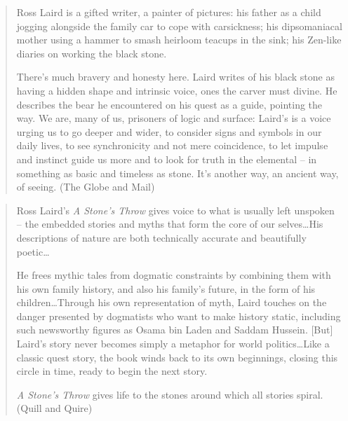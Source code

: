 \documentclass[10pt,DIV09,letterpaper,oneside,headsepline]{scrreprt}
\begin{document}
\begin{quotation}
Ross Laird is a gifted writer, a painter of pictures: his father as a child jogging alongside the family car to cope with carsickness; his dipsomaniacal mother using a hammer to smash heirloom teacups in the sink; his Zen-like diaries on working the black stone.

There's much bravery and honesty here. Laird writes of his black stone as having a hidden shape and intrinsic voice, ones the carver must divine. He describes the bear he encountered on his quest as a guide, pointing the way. We are, many of us, prisoners of logic and surface: Laird's is a voice urging us to go deeper and wider, to consider signs and symbols in our daily lives, to see synchronicity and not mere coincidence, to let impulse and instinct guide us more and to look for truth in the elemental -- in something as basic and timeless as stone. It's another way, an ancient way, of seeing. (The Globe and Mail) \end{quotation}

\begin{quotation}
Ross Laird's \textit{A Stone's Throw} gives voice to what is usually left unspoken -- the embedded stories and myths that form the core of our selves\ldots His descriptions of nature are both technically accurate and beautifully poetic\ldots

He frees mythic tales from dogmatic constraints by combining them with his own family history, and also his family's future, in the form of his children\ldots Through his own representation of myth, Laird touches on the danger presented by dogmatists who want to make history static, including such newsworthy figures as Osama bin Laden and Saddam Hussein. [But] Laird's story never becomes simply a metaphor for world politics\dots Like a classic quest story, the book winds back to its own beginnings, closing this circle in time, ready to begin the next story.

\textit{A Stone's Throw} gives life to the stones around which all stories spiral. (Quill and Quire)
\end{quotation}
\end{document}

